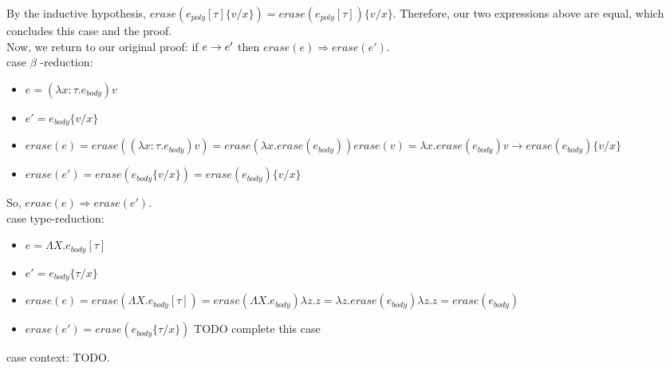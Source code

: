 \documentclass[10pt]{article}
\begin{document}
\begin{exercise}
By the inductive hypothesis, $\mathit{erase}(e_{poly}[\tau]\{v/x\}) = \mathit{erase}(e_{poly}[\tau])\{v/x\}$. Therefore, our two expressions above are equal, which concludes this case and the proof. \checkmark\\


Now, we return to our original proof: if $e \rightarrow e'$ then
$\mathit{erase}(e) \Rightarrow \mathit{erase}(e')$.\\

{\sc case} $\beta$ {\sc -reduction}:\\
\begin{itemize}

\item $e = (\lambda x: \tau. e_{body}) v$

\item $e' = e_{body}\{v/x\}$

\item $\mathit{erase}(e) = \mathit{erase}((\lambda x:\tau. e_{body}) v) = \mathit{erase}(\lambda x.\mathit{erase}(e_{body})) \mathit{erase}(v) = \lambda x.\mathit{erase}(e_{body}) v \rightarrow \mathit{erase}(e_{body})\{v/x\}$

\item $\mathit{erase}(e') = \mathit{erase}(e_{body} \{v/x\}) = \mathit{erase}(e_{body})\{v/x\}$\\

\end{itemize}

So, $\mathit{erase}(e) \Rightarrow \mathit{erase}(e').$ \checkmark \\

{\sc case type-reduction}:

\begin{itemize}
\item $e = \Lambda X. e_{body} [\tau]$
\item $e' = e_{body} \{\tau / x\}$
\item $\mathit{erase}(e) = \mathit{erase}(\Lambda X. e_{body}[\tau]) = \mathit{erase}(\Lambda X. e_{body}) \lambda z.z = \lambda z.\mathit{erase}(e_{body}) \lambda z. z = \mathit{erase}(e_{body})$
\item $\mathit{erase}(e') = \mathit{erase}(e_{body} \{\tau/x\})$ TODO complete this case
\end{itemize}


{\sc case context}: TODO.\\


  

\end{exercise}
\end{document}
